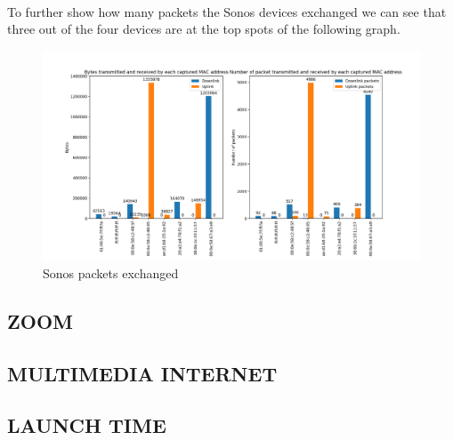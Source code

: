 \\
To further show how many packets the Sonos devices exchanged we can see that three out of the four
devices are at the top spots of the following graph.
\begin{figure}[h]
    \includegraphics[width=\textwidth]{Graphs/SONOS_bytes_packets.png}
    \caption{Sonos packets exchanged}
    \label{fig:Sonos_packets}
\end{figure}


 
\subsection{ZOOM}

\subsection{MULTIMEDIA INTERNET}

\subsection{LAUNCH TIME}
